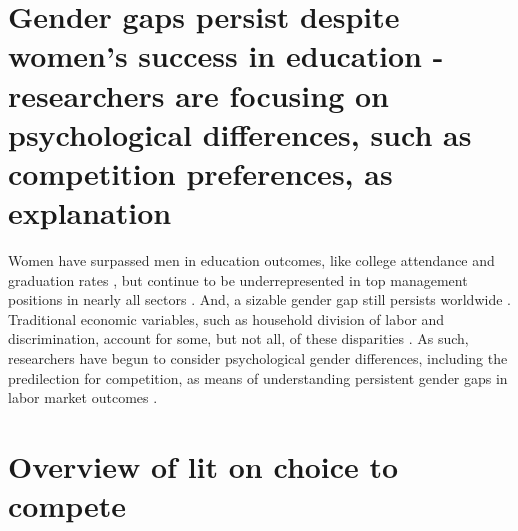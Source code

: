 \documentclass[a4paper, nobind]{templates/ociamthesis}
\begin{document}
\hypertarget{gender-gaps-persist-despite-womens-success-in-education---researchers-are-focusing-on-psychological-differences-such-as-competition-preferences-as-explanation}{%
\section{Gender gaps persist despite women's success in education - researchers are focusing on psychological differences, such as competition preferences, as explanation}\label{gender-gaps-persist-despite-womens-success-in-education---researchers-are-focusing-on-psychological-differences-such-as-competition-preferences-as-explanation}}

Women have surpassed men in education outcomes, like college attendance and graduation rates \autocite{Blau2017,Goldin2006,Stoet2014}, but continue to be underrepresented in top management positions in nearly all sectors \autocite{Bertrand2001}. And, a sizable gender gap still persists worldwide \autocite{Blau2017}. Traditional economic variables, such as household division of labor and discrimination, account for some, but not all, of these disparities \autocite{Blau2017}. As such, researchers have begun to consider psychological gender differences, including the predilection for competition, as means of understanding persistent gender gaps in labor market outcomes \autocite[for review, see][]{Niederle2011}.

\hypertarget{overview-of-lit-on-choice-to-compete}{%
\section{Overview of lit on choice to compete}\label{overview-of-lit-on-choice-to-compete}}
\end{document}
